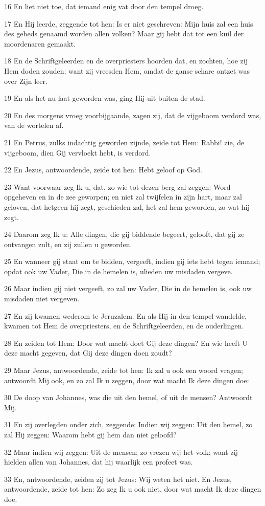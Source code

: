 \par 16 En liet niet toe, dat iemand enig vat door den tempel droeg.
\par 17 En Hij leerde, zeggende tot hen: Is er niet geschreven: Mijn huis zal een huis des gebeds genaamd worden allen volken? Maar gij hebt dat tot een kuil der moordenaren gemaakt.
\par 18 En de Schriftgeleerden en de overpriesters hoorden dat, en zochten, hoe zij Hem doden zouden; want zij vreesden Hem, omdat de ganse schare ontzet was over Zijn leer.
\par 19 En als het nu laat geworden was, ging Hij uit buiten de stad.
\par 20 En des morgens vroeg voorbijgaande, zagen zij, dat de vijgeboom verdord was, van de wortelen af.
\par 21 En Petrus, zulks indachtig geworden zijnde, zeide tot Hem: Rabbi! zie, de vijgeboom, dien Gij vervloekt hebt, is verdord.
\par 22 En Jezus, antwoordende, zeide tot hen: Hebt geloof op God.
\par 23 Want voorwaar zeg Ik u, dat, zo wie tot dezen berg zal zeggen: Word opgeheven en in de zee geworpen; en niet zal twijfelen in zijn hart, maar zal geloven, dat hetgeen hij zegt, geschieden zal, het zal hem geworden, zo wat hij zegt.
\par 24 Daarom zeg Ik u: Alle dingen, die gij biddende begeert, gelooft, dat gij ze ontvangen zult, en zij zullen u geworden.
\par 25 En wanneer gij staat om te bidden, vergeeft, indien gij iets hebt tegen iemand; opdat ook uw Vader, Die in de hemelen is, ulieden uw misdaden vergeve.
\par 26 Maar indien gij niet vergeeft, zo zal uw Vader, Die in de hemelen is, ook uw misdaden niet vergeven.
\par 27 En zij kwamen wederom te Jeruzalem. En als Hij in den tempel wandelde, kwamen tot Hem de overpriesters, en de Schriftgeleerden, en de ouderlingen.
\par 28 En zeiden tot Hem: Door wat macht doet Gij deze dingen? En wie heeft U deze macht gegeven, dat Gij deze dingen doen zoudt?
\par 29 Maar Jezus, antwoordende, zeide tot hen: Ik zal u ook een woord vragen; antwoordt Mij ook, en zo zal Ik u zeggen, door wat macht Ik deze dingen doe:
\par 30 De doop van Johannes, was die uit den hemel, of uit de mensen? Antwoordt Mij.
\par 31 En zij overlegden onder zich, zeggende: Indien wij zeggen: Uit den hemel, zo zal Hij zeggen: Waarom hebt gij hem dan niet geloofd?
\par 32 Maar indien wij zeggen: Uit de mensen; zo vrezen wij het volk; want zij hielden allen van Johannes, dat hij waarlijk een profeet was.
\par 33 En, antwoordende, zeiden zij tot Jezus: Wij weten het niet. En Jezus, antwoordende, zeide tot hen: Zo zeg Ik u ook niet, door wat macht Ik deze dingen doe.

